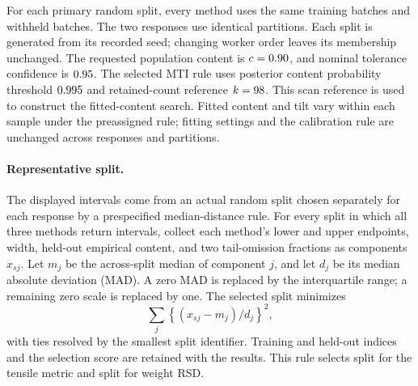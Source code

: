 \documentclass[11pt]{article}
\newcommand{\TableStyle}{\footnotesize\setlength{\tabcolsep}{4pt}\renewcommand{\arraystretch}{1.08}}
\begin{document}
\begin{table}[H]
\centering
\caption{\textbf{Response diagnostics for product code \PharmaProductCode{}.}
The reported tensile metric is used in the main article. Weight RSD has a
stronger asymmetric-placement interpretation. Film-coated-tablet hardness has
more ties and is excluded.}
\label{tab:supp-pharma-response-diagnostics}
\TableStyle

\end{table}

For each primary random split, every method uses the same \PharmaTrain{}
training batches and \PharmaHeldout{} withheld batches. The two responses use
identical partitions. Each split is generated from its recorded seed; changing
worker order leaves its membership unchanged. The requested population
content is \(c=0.90\), and nominal tolerance confidence is
\(0.95\). The selected MTI rule uses posterior content
probability threshold \(0.995\) and retained-count reference
\(k=98\). This scan reference is used to construct
the fitted-content search. Fitted content and tilt vary within each sample
under the preassigned rule; fitting settings and the calibration rule are
unchanged across responses and partitions.

\paragraph{Representative split.}
The displayed intervals come from an actual random split chosen separately
for each response by a prespecified median-distance rule. For every split in
which all three methods return intervals, collect each method's lower and
upper endpoints, width, held-out empirical content, and two tail-omission
fractions as components \(x_{sj}\). Let \(m_j\) be the across-split median
of component \(j\), and let \(d_j\) be its median absolute deviation (MAD). A zero
MAD is replaced by the interquartile range; a remaining zero scale is replaced
by one. The selected split minimizes
\[
  \sum_j \left\{(x_{sj}-m_j)/d_j\right\}^2,
\]
with ties resolved by the smallest split identifier. Training and held-out
indices and the selection score are retained with the results. This rule
selects split \PharmaTensileRepresentative{} for the tensile metric and
split \PharmaRsdRepresentative{} for weight RSD.
\end{document}
